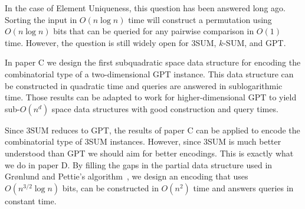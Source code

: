 In the case of Element Uniqueness, this question has been answered long ago.
Sorting the input in \(O(n \log n)\) time will construct a permutation using
\(O(n \log n)\) bits that can be queried for any pairwise comparison in
\(O(1)\) time. However, the question is still widely open for
3SUM, \(k\)-SUM, and GPT.

In paper C we design the first subquadratic space data structure for encoding
the combinatorial type of a two-dimensional GPT instance. This data structure
can be constructed in quadratic time and queries are answered in sublogarithmic
time. Those results can be adapted to work for higher-dimensional GPT to yield
sub-\(O(n^d)\) space data structures with good construction and query times.

Since 3SUM reduces to GPT, the results of paper C can be applied to encode the
combinatorial type of 3SUM instances. However, since 3SUM is much better
understood than GPT we should aim for better encodings. This is exactly what we
do in paper D. By filling the gaps in the partial data structure
used in Gr\o nlund and Pettie's algorithm~\cite{GP18}, we design an encoding
that uses \(O(n^{3/2} \log n)\) bits, can be constructed in \(O(n^2)\) time and
answers queries in constant time.

